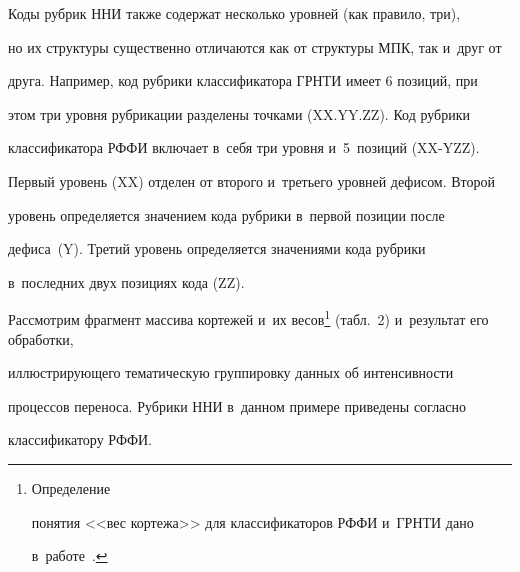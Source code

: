      


     Коды рубрик ННИ также содержат несколько уровней (как правило, три), 


но их структуры существенно отличаются как от структуры МПК, так и~друг от 


друга. Например, код рубрики классификатора ГРНТИ имеет 6 позиций, при 


этом три уровня рубрикации разделены точками (XX.YY.ZZ). Код рубрики 


классификатора РФФИ включает в~себя три уровня и~5~позиций (XX-YZZ). 


Первый уровень (XX) отделен от второго и~третьего уровней дефисом. Второй 


уровень определяется значением кода рубрики в~первой позиции после 


дефиса~(Y). Третий уровень определяется значениями кода рубрики 


в~последних двух позициях кода (ZZ).


     


     Рассмотрим фрагмент массива кортежей и~их весов\footnote{Определение 


понятия <<вес кортежа>> для классификаторов РФФИ и~ГРНТИ дано 


в~работе~\cite{19-mm}.} (табл.~2) и~результат его обработки, 


иллюстрирующего тематическую группировку данных об интенсивности 


процессов переноса. Рубрики ННИ в~данном примере приведены согласно 


классификатору РФФИ.


     


